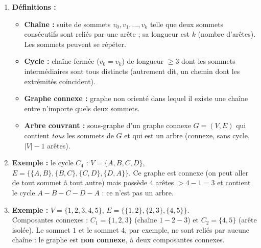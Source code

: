 \documentclass[11pt]{article}
\begin{document}
\begin{corrige}
\begin{enumerate}
\item \textbf{Définitions :}
\begin{itemize}
    \item \textbf{Chaîne :} suite de sommets $v_0, v_1, \dots, v_k$ telle que deux sommets consécutifs sont reliés par une arête ; sa longueur est $k$ (nombre d'arêtes). Les sommets peuvent se répéter.
    \item \textbf{Cycle :} chaîne fermée ($v_0 = v_k$) de longueur $\geq 3$ dont les sommets intermédiaires sont tous distincts (autrement dit, un chemin dont les extrémités coïncident).
    \item \textbf{Graphe connexe :} graphe non orienté dans lequel il existe une chaîne entre n'importe quels deux sommets.
    \item \textbf{Arbre couvrant :} sous-graphe d'un graphe connexe $G = (V, E)$ qui contient \emph{tous} les sommets de $G$ et qui est un arbre (connexe, sans cycle, $|V|-1$ arêtes).
\end{itemize}
\item \textbf{Exemple :} le cycle $C_4$ : $V = \{A, B, C, D\}$, $E = \{\{A,B\}, \{B,C\}, \{C,D\}, \{D,A\}\}$. Ce graphe est connexe (on peut aller de tout sommet à tout autre) mais possède $4$ arêtes $> 4 - 1 = 3$ et contient le cycle $A-B-C-D-A$ : ce n'est pas un arbre.
\item \textbf{Exemple :} $V = \{1, 2, 3, 4, 5\}$, $E = \{\{1,2\}, \{2,3\}, \{4,5\}\}$.\\
Composantes connexes : $C_1 = \{1, 2, 3\}$ (chaîne $1-2-3$) et $C_2 = \{4, 5\}$ (arête isolée). Le sommet $1$ et le sommet $4$, par exemple, ne sont reliés par aucune chaîne : le graphe est \textbf{non connexe}, à deux composantes connexes.
\end{enumerate}
\end{corrige}
\end{document}
